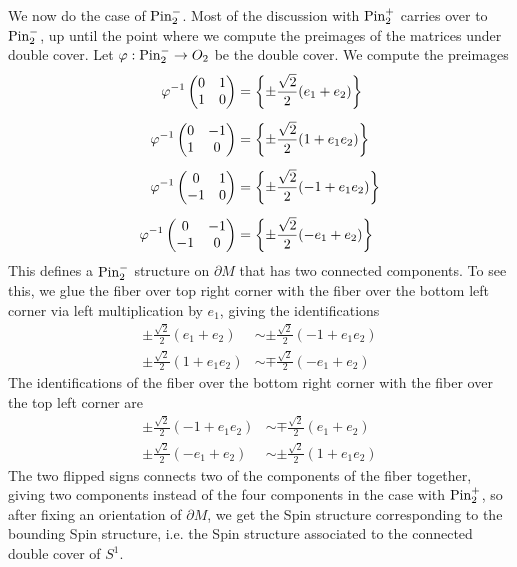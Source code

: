 \begin{exmp}
We now do the case of $\mathrm{Pin}^-_2$. Most of the discussion with $\mathrm{Pin}^+_2$ carries
over to $\mathrm{Pin}^-_2$, up until the point where we compute the preimages of
the matrices under double cover. Let $\varphi : \mathrm{Pin}_2^- \to O_2$ be the
double cover. We compute the preimages
%
\begin{align*}
\varphi^{-1}\begin{pmatrix}
0 & 1 \\
1 & 0
\end{pmatrix} &= \left\lbrace \pm \frac{\sqrt{2}}{2}(e_1 + e_2) \right\rbrace \\[5pt]
\varphi^{-1}\begin{pmatrix}
0 & -1 \\
1 & 0
\end{pmatrix} &= \left\lbrace \pm\frac{\sqrt{2}}{2}(1 + e_1e_2) \right\rbrace \\[5pt]
\varphi^{-1}\begin{pmatrix}
0 & 1 \\
-1 & 0
\end{pmatrix} &= \left\lbrace \pm\frac{\sqrt{2}}{2}(-1 + e_1e_2) \right\rbrace \\[5pt]
\varphi^{-1}\begin{pmatrix}
0 & -1 \\
-1 & 0
\end{pmatrix} &= \left\lbrace \pm\frac{\sqrt{2}}{2}(-e_1 + e_2) \right\rbrace
\end{align*}
%
This defines a $\mathrm{Pin}^-_2$ structure on $\partial M$ that has two connected
components. To see this, we glue the fiber over top right corner
with the fiber over the bottom left corner via left multiplication by $e_1$,
giving the identifications
%
\begin{align*}
\pm \frac{\sqrt{2}}{2}(e_1 + e_2) &\sim \pm\frac{\sqrt{2}}{2}(-1 + e_1e_2) \\
\pm\frac{\sqrt{2}}{2}(1 + e_1e_2) &\sim \mp\frac{\sqrt{2}}{2}(-e_1 + e_2)
\end{align*}
%
The identifications of the fiber over the bottom right corner with the fiber
over the top left corner are
%
\begin{align*}
\pm\frac{\sqrt{2}}{2}(-1 + e_1e_2) &\sim \mp\frac{\sqrt{2}}{2}(e_1 + e_2)\\
\pm\frac{\sqrt{2}}{2}(-e_1 + e_2) &\sim \pm\frac{\sqrt{2}}{2}(1 + e_1e_2)
\end{align*}
The two flipped signs connects two of the components of the fiber together,
giving two components instead of the four components in the case with
$\mathrm{Pin}^+_2$, so after fixing an orientation of $\partial M$, we get the Spin
structure corresponding to the bounding Spin structure, i.e. the Spin structure
associated to the connected double cover of $S^1$.
%
\end{exmp}
